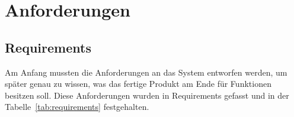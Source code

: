 \chapter{Anforderungen}
\label{cha:Anforderungen}


\section{Requirements}
Am Anfang mussten die Anforderungen an das System entworfen werden, um später genau zu wissen, was das fertige Produkt am Ende für Funktionen besitzen soll. Diese Anforderungen wurden in Requirements gefasst und in der Tabelle~\ref{tab:requirements} festgehalten.



